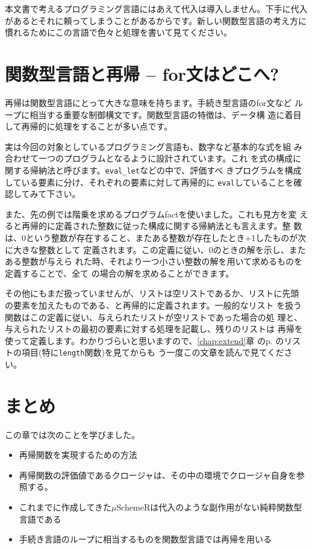 本文書で考えるプログラミング言語にはあえて代入は導入しません。下手に代入があるとそれに頼ってしまうことがあるからです。新しい関数型言語の考え方に慣れるためにこの言語で色々と処理を書いて見てください。


\section{関数型言語と再帰 -- for文はどこへ?}

再帰は関数型言語にとって大きな意味を持ちます。手続き型言語のfor文など
ループに相当する重要な制御構文です。関数型言語の特徴は、データ構
造に着目して再帰的に処理をすることが多い点です。

実は今回の対象としているプログラミング言語も、数字など基本的な式を組
み合わせて一つのプログラムとなるように設計されています。これ
を式の構成に関する帰納法と呼びます。{\tt eval\_let}などの中で、評価すべ
きプログラムを構成している要素に分け、それぞれの要素に対して再帰的に
{\tt eval}していることを確認してみて下さい。

また、先の例では階乗を求めるプログラムfactを使いました。これも見方を変
えると再帰的に定義された整数に従った構成に関する帰納法とも言えます。整
数
は、0という整数が存在すること、またある整数が存在したとき+1したものが次に大きな整数として
定義されます。この定義に従い、0のときの解を示し、またある整数が与えら
れた時、それより一つ小さい整数の解を用いて求めるものを定義することで、全て
の場合の解を求めることができます。

その他にもまだ扱っていませんが、リストは空リストであるか、リストに先頭
の要素を加えたものである、と再帰的に定義されます。一般的なリスト
を扱う関数はこの定義に従い、与えられたリストが空リストであった場合の処
理と、与えられたリストの最初の要素に対する処理を記載し、残りのリストは
再帰を使って定義します。わかりづらいと思いますので、\ref{chap:extend}章
のp. \pageref{sec:list}のリストの項目(特に{\tt length}関数)を見てからも
う一度この文章を読んで見てください。


\section{まとめ}

この章では次のことを学びました。

\begin{itemize}
\item 再帰関数を実現するための方法
\item 再帰関数の評価値であるクロージャは、その中の環境でクロージャ自身を参照する。
\item これまでに作成してきた$\mu$SchemeRは代入のような副作用がない純粋関数型言語である
\item 手続き言語のループに相当するものを関数型言語では再帰を用いる
\end{itemize}

